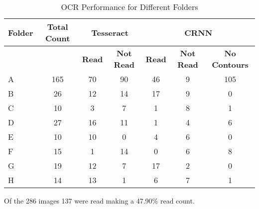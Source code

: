 \begin{table}[h]
    \centering
    \caption{OCR Performance for Different Folders}
    \label{tab:ocr_performance}
    \begin{tabular}{|l|c|c|c|c|c|c|}
        \hline
        \textbf{Folder} & \textbf{Total Count} & \multicolumn{2}{c|}{\textbf{Tesseract}} & \multicolumn{3}{c|}{\textbf{CRNN}}                                                            \\
        \hline
                        &                      & \textbf{Read}                           & \textbf{Not Read}                  & \textbf{Read} & \textbf{Not Read} & \textbf{No Contours} \\
        \hline
        A               & 165                  & 70                                      & 90                                 & 46            & 9                 & 105                  \\
        B               & 26                   & 12                                      & 14                                 & 17            & 9                 & 0                    \\
        C               & 10                   & 3                                       & 7                                  & 1             & 8                 & 1                    \\
        D               & 27                   & 16                                      & 11                                 & 1             & 4                 & 6                    \\
        E               & 10                   & 10                                      & 0                                  & 4             & 6                 & 0                    \\
        F               & 15                   & 1                                       & 14                                 & 0             & 6                 & 8                    \\
        G               & 19                   & 12                                      & 7                                  & 17            & 2                 & 0                    \\
        H               & 14                   & 13                                      & 1                                  & 6             & 7                 & 1                    \\
        \hline
    \end{tabular}
\end{table}

Of the 286 images 137 were read making a 47.90\% read count.





